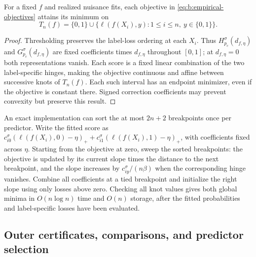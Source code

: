 \begin{proposition}
\label{prop:b:threshold-search}
For a fixed $f$ and realized nuisance fits, each objective in
\eqref{eq:b:empirical-objectives} attains its minimum on
\[
 T_n(f)=\{0,1\}\cup
 \{\ell(f(X_i),y):1\leq i\leq n,\ y\in\{0,1\}\}.
\]
\end{proposition}

\begin{proof}
Thresholding preserves the label-loss ordering at each $X_i$.
Thus $H_{p_c}^\sigma(d_{f,\eta})$ and $G_{p_c}^\sigma(d_{f,\eta})$
are fixed coefficients times $d_{f,\eta}$ throughout $[0,1]$; at
$d_{f,\eta}=0$ both representations vanish. Each score is a fixed linear
combination of the two label-specific hinges, making the objective continuous
and affine between successive knots of $T_n(f)$. Each such interval has
an endpoint minimizer, even if the objective is constant there.
Signed correction coefficients may prevent convexity but preserve this result.
\end{proof}

An exact implementation can sort the at most $2n+2$ breakpoints once
per predictor. Write the fitted score as
$c_{i0}^\sigma(\ell(f(X_i),0)-\eta)_+
+c_{i1}^\sigma(\ell(f(X_i),1)-\eta)_+$, with coefficients fixed across
$\eta$. Starting from the objective at zero, sweep the sorted breakpoints:
the objective is updated by its current slope times the distance to the
next breakpoint, and the slope increases by $c_{iy}^\sigma/(n\beta)$
when the corresponding hinge vanishes. Combine all coefficients at a
tied breakpoint and initialize the right slope using only losses above
zero. Checking all knot values gives both global minima in
$O(n\log n)$ time and $O(n)$ storage, after the fitted probabilities
and label-specific losses have been evaluated.

\subsection{Outer certificates, comparisons, and predictor selection}
\label{app:decision-guarantees}

